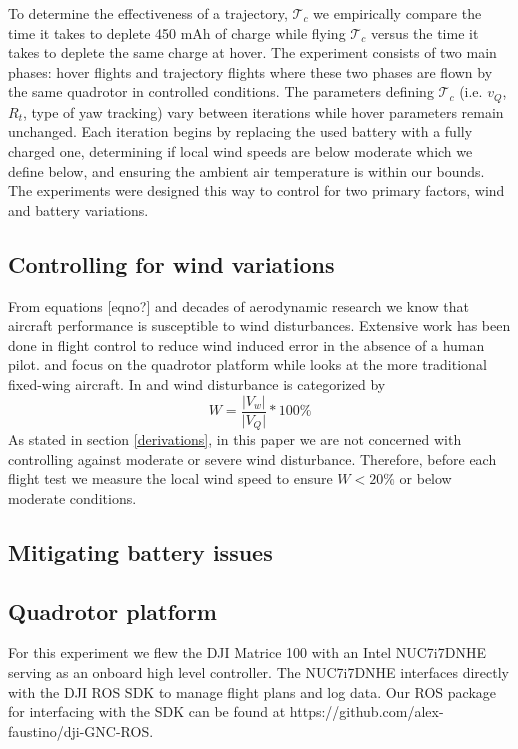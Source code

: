 
To determine the effectiveness of a trajectory, $\mathscr{T}_c$ we empirically compare the time it takes to deplete 450 mAh of charge while flying $\mathscr{T}_c$ versus the time it takes to deplete the same charge at hover. The experiment consists of two main phases: hover flights and trajectory flights where these two phases are flown by the same quadrotor in controlled conditions. The parameters defining $\mathscr{T}_c$ (i.e. $v_Q$, $R_t$, type of yaw tracking) vary between iterations while hover parameters remain unchanged. Each iteration begins by replacing the used battery with a fully charged one, determining if local wind speeds are below moderate which we define below, and ensuring the ambient air temperature is within our bounds. The experiments were designed this way to control for two primary factors, wind and battery variations.

\subsection{Controlling for wind variations}
From equations [eqno?] and decades of aerodynamic research we know that aircraft performance is susceptible to wind disturbances. Extensive work has been done in flight control to reduce wind induced error in the absence of a human pilot. \cite{escareno2013trajectory} and \cite{waslander2009wind} focus on the quadrotor platform while \cite{mcgee2006path} looks at the more traditional fixed-wing aircraft.
In \cite{escareno2013trajectory} and \cite{mcgee2006path} wind disturbance is categorized by 
\begin{equation}
    W = \frac{\lvert V_w \rvert}{\lvert V_Q \rvert}*100\%
\end{equation}
As stated in section \ref{derivations}, in this paper we are not concerned with controlling against moderate or severe wind disturbance. Therefore, before each flight test we measure the local wind speed to ensure $W<20\%$ or below moderate conditions.

\subsection{Mitigating battery issues}


\subsection{Quadrotor platform}
For this experiment we flew the DJI Matrice 100 with an Intel NUC7i7DNHE serving as an onboard high level controller. The NUC7i7DNHE interfaces directly with the DJI ROS SDK to manage flight plans and log data. Our ROS package for interfacing with the SDK can be found at https://github.com/alex-faustino/dji-GNC-ROS.

